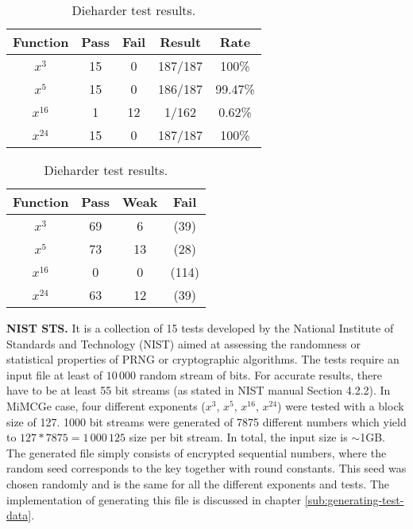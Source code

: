 \documentclass{Resources/UoBLab1}
\theoremstyle{definition}
\begin{document}
\begin{table}[]
    \begin{minipage}{.5\textwidth}
        \centering
        \begin{tabular}{|c|c|c|c|c|}
            \hline
            Function & Pass & Fail & Result & Rate \\
            \hline
            $x^3$ & 15 & 0 & 187/187 & 100\% \\
            $x^5$ & 15 & 0 & 186/187 & 99.47\% \\
            $x^{16}$ & 1 & 12 & 1/162 & 0.62\% \\
            $x^{24}$ & 15 & 0 & 187/187 & 100\% \\
            \hline
        \end{tabular}
        \caption{NIST test results.}\label{tab:NIST-results}
    \end{minipage}%
    \begin{minipage}{.5\textwidth}
        \centering
        \begin{tabular}{|c|c|c|c|}
            \hline
            Function & Pass & Weak & Fail \\
            \hline
            $x^3$ & 69 & 6 & (39) \\
            $x^5$ & 73 & 13 & (28) \\
            $x^{16}$ & 0 & 0 & (114) \\
            $x^{24}$ & 63 & 12 & (39) \\
            \hline
        \end{tabular}
        \caption{Dieharder test results.}\label{tab:dieharder-results}
    \end{minipage}
\end{table}

\noindent\textbf{NIST STS.} It is a collection of 15 tests developed by the National Institute of Standards and Technology (NIST) aimed at assessing the randomness or statistical properties of PRNG or cryptographic algorithms. The tests require an input file at least of $10\,000$ random stream of bits. For accurate results, there have to be at least 55 bit streams (as stated in NIST manual Section 4.2.2\cite{NIST}). In MiMCGe case, four different exponents ($x^3$, $x^5$, $x^{16}$, $x^{24}$) were tested with a block size of 127. 1000 bit streams were generated of 7875 different numbers which yield to $127 * 7875 = 1\,000\,125$ size per bit stream. In total, the input size is $\sim$1GB. The generated file simply consists of encrypted sequential numbers, where the random seed corresponds to the key together with round constants. This seed was chosen randomly and is the same for all the different exponents and tests. The implementation of generating this file is discussed in chapter \ref{sub:generating-test-data}.
\end{document}
